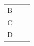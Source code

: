 {\begin{center}
\begin{xtabular*}{\mytablewidth}[t]{|p{10\mystarwidth}|p{10\mystarwidth}|p{10\mystarwidth}|}
    
        B &
    
    
         &
    
    
     \tabularnewline{}
    
    
        C &
    
    
         &
    
    
     \tabularnewline{}
    
    
        D &
    
    
         &
    
    

\end{xtabular*}
\end{center}}
